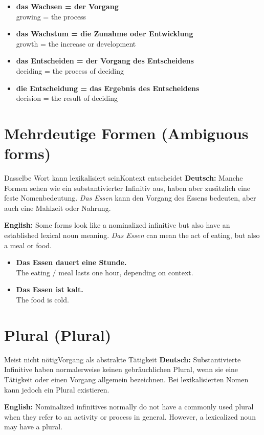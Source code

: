\documentclass[a4paper,11pt]{article}
\newcommand{\GermanText}[1]{\textbf{Deutsch: }#1\par}
\newcommand{\EnglishText}[1]{{\small\color{SoftGray}\textbf{English: }#1\par}}
\newcommand{\ExampleItem}[2]{\item \textbf{#1}\\{\small\color{SoftGray}#2}}
\begin{document}
\begin{exbox}
\begin{itemize}
\ExampleItem{das Wachsen = der Vorgang}{growing = the process}
\ExampleItem{das Wachstum = die Zunahme oder Entwicklung}{growth = the increase or development}
\ExampleItem{das Entscheiden = der Vorgang des Entscheidens}{deciding = the process of deciding}
\ExampleItem{die Entscheidung = das Ergebnis des Entscheidens}{decision = the result of deciding}
\end{itemize}
\end{exbox}

\section{Mehrdeutige Formen \textnormal{(Ambiguous forms)}}
\begin{grammarentry}{Dasselbe Wort kann lexikalisiert sein}{Kontext entscheidet}
\GermanText{Manche Formen sehen wie ein substantivierter Infinitiv aus, haben aber zusätzlich eine feste Nomenbedeutung. \textit{Das Essen} kann den Vorgang des Essens bedeuten, aber auch eine Mahlzeit oder Nahrung.}
\EnglishText{Some forms look like a nominalized infinitive but also have an established lexical noun meaning. \textit{Das Essen} can mean the act of eating, but also a meal or food.}
\end{grammarentry}

\begin{exbox}
\begin{itemize}
\ExampleItem{Das Essen dauert eine Stunde.}{The eating / meal lasts one hour, depending on context.}
\ExampleItem{Das Essen ist kalt.}{The food is cold.}
\end{itemize}
\end{exbox}

\section{Plural \textnormal{(Plural)}}
\begin{grammarentry}{Meist nicht nötig}{Vorgang als abstrakte Tätigkeit}
\GermanText{Substantivierte Infinitive haben normalerweise keinen gebräuchlichen Plural, wenn sie eine Tätigkeit oder einen Vorgang allgemein bezeichnen. Bei lexikalisierten Nomen kann jedoch ein Plural existieren.}
\EnglishText{Nominalized infinitives normally do not have a commonly used plural when they refer to an activity or process in general. However, a lexicalized noun may have a plural.}
\end{grammarentry}
\end{document}
